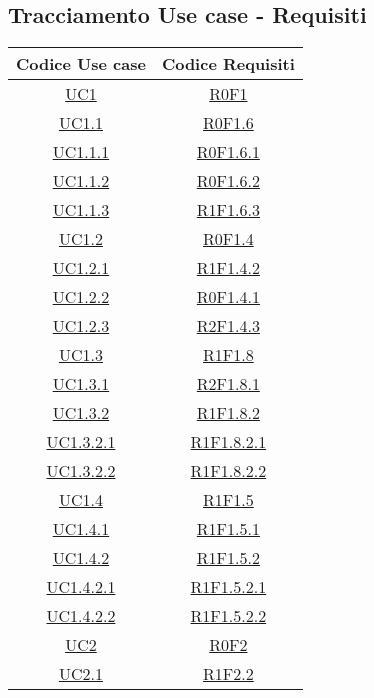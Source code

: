 \subsection{Tracciamento Use case - Requisiti}
\normalsize
\begin{longtable}{|c|c|}
\hline
\textbf{Codice Use case} & \textbf{Codice Requisiti} \\
\hline
\endhead
\hyperlink{UC1}{UC1} & \hyperlink{R0F1}{R0F1}\\
\hline
\hyperlink{UC1.1}{UC1.1} & \hyperlink{R0F1.6}{R0F1.6}\\
\hline
\hyperlink{UC1.1.1}{UC1.1.1} & \hyperlink{R0F1.6.1}{R0F1.6.1}\\
\hline
\hyperlink{UC1.1.2}{UC1.1.2} & \hyperlink{R0F1.6.2}{R0F1.6.2}\\
\hline
\hyperlink{UC1.1.3}{UC1.1.3} & \hyperlink{R1F1.6.3}{R1F1.6.3}\\
\hline
\hyperlink{UC1.2}{UC1.2} & \hyperlink{R0F1.4}{R0F1.4}\\
\hline
\hyperlink{UC1.2.1}{UC1.2.1} & \hyperlink{R1F1.4.2}{R1F1.4.2}\\
\hline
\hyperlink{UC1.2.2}{UC1.2.2} & \hyperlink{R0F1.4.1}{R0F1.4.1}\\
\hline
\hyperlink{UC1.2.3}{UC1.2.3} & \hyperlink{R2F1.4.3}{R2F1.4.3}\\
\hline
\hyperlink{UC1.3}{UC1.3} & \hyperlink{R1F1.8}{R1F1.8}\\
\hline
\hyperlink{UC1.3.1}{UC1.3.1} & \hyperlink{R2F1.8.1}{R2F1.8.1}\\
\hline
\hyperlink{UC1.3.2}{UC1.3.2} & \hyperlink{R1F1.8.2}{R1F1.8.2}\\
\hline
\hyperlink{UC1.3.2.1}{UC1.3.2.1} & \hyperlink{R1F1.8.2.1}{R1F1.8.2.1}\\
\hline
\hyperlink{UC1.3.2.2}{UC1.3.2.2} & \hyperlink{R1F1.8.2.2}{R1F1.8.2.2}\\
\hline
\hyperlink{UC1.4}{UC1.4} & \hyperlink{R1F1.5}{R1F1.5}\\
\hline
\hyperlink{UC1.4.1}{UC1.4.1} & \hyperlink{R1F1.5.1}{R1F1.5.1}\\
\hline
\hyperlink{UC1.4.2}{UC1.4.2} & \hyperlink{R1F1.5.2}{R1F1.5.2}\\
\hline
\hyperlink{UC1.4.2.1}{UC1.4.2.1} & \hyperlink{R1F1.5.2.1}{R1F1.5.2.1}\\
\hline
\hyperlink{UC1.4.2.2}{UC1.4.2.2} & \hyperlink{R1F1.5.2.2}{R1F1.5.2.2}\\
\hline
\hyperlink{UC2}{UC2} & \hyperlink{R0F2}{R0F2}\\
\hline
\hyperlink{UC2.1}{UC2.1} & \hyperlink{R1F2.2}{R1F2.2}\\

\end{longtable}
